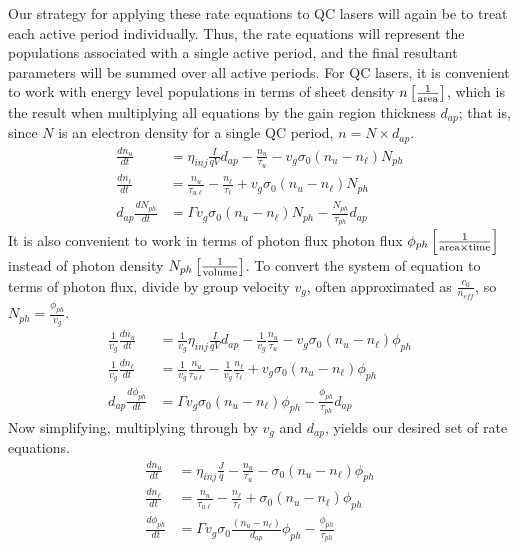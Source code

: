 \documentclass[12pt]{report}
\begin{document}
Our strategy for applying these rate equations to QC lasers will again be to treat each active period individually.  Thus, the rate equations will represent the populations associated with a single active period, and the final resultant parameters will be summed over all active periods.  For QC lasers, it is convenient to work with energy level populations in terms of sheet density $n \left[\frac{1}{\textnormal{area}}\right]$, which is the result when multiplying all equations by the gain region thickness $d_{ap}$; that is, since $N$ is an electron density for a single QC period, $n=N\times d_{ap}$.
\begin{subequations}
\begin{align}
\frac{d n_u}{dt}&=\eta_\textit{inj} \frac{I}{q V} d_{ap}-\frac{n_u}{\tau_u}-v_g \sigma_0 (n_u-n_\ell) N_{ph}\\
\frac{d n_\ell}{dt}&=\frac{n_u}{\tau_{u\ell}}-\frac{n_\ell}{\tau_\ell}+v_g \sigma_0 (n_u-n_\ell) N_{ph}\\
d_{ap} \frac{d N_{ph}}{dt}&=\Gamma v_g \sigma_0 (n_u-n_\ell) N_{ph} - \frac{N_{ph}}{\tau_{ph}} d_{ap}
\end{align}
\end{subequations}
It is also convenient to work in terms of photon flux photon flux $\phi_{ph} \left[\frac{1}{\textnormal{area}\times\textnormal{time}}\right]$ instead of photon density $N_{ph} \left[\frac{1}{\textnormal{volume}}\right]$.  To convert the system of equation to terms of photon flux, divide by group velocity $v_g$, often approximated as $\frac{c_0}{n_\textit{eff}}$, so $N_{ph}=\frac{\phi_{ph}}{v_g}$.
\begin{subequations}
\begin{align}
\frac{1}{v_g} \frac{d n_u}{dt}&=\frac{1}{v_g} \eta_\textit{inj} \frac{I}{q V} d_{ap}-\frac{1}{v_g} \frac{n_u}{\tau_u}-v_g \sigma_0 (n_u-n_\ell) \phi_{ph}\\
\frac{1}{v_g} \frac{d n_\ell}{dt}&=\frac{1}{v_g} \frac{n_u}{\tau_{u\ell}}-\frac{1}{v_g} \frac{n_\ell}{\tau_\ell}+v_g \sigma_0 (n_u-n_\ell) \phi_{ph}\\
d_{ap} \frac{d \phi_{ph}}{dt}&=\Gamma v_g \sigma_0 (n_u-n_\ell) \phi_{ph} - \frac{\phi_{ph}}{\tau_{ph}} d_{ap}
\end{align}
\end{subequations}
Now simplifying, multiplying through by $v_g$ and $d_{ap}$, yields our desired set of rate equations.
\begin{subequations}
\label{chpt1eqn:req}
\begin{align}
\label{chpt1eqn:reqA}
\frac{d n_u}{dt}&=\eta_\textit{inj} \frac{J}{q}- \frac{n_u}{\tau_u}-\sigma_0 (n_u-n_\ell) \phi_{ph}\\
\label{chpt1eqn:reqB}
\frac{d n_\ell}{dt}&=\frac{n_u}{\tau_{u\ell}}- \frac{n_\ell}{\tau_\ell}+\sigma_0 (n_u-n_\ell) \phi_{ph}\\
\label{chpt1eqn:reqC}
\frac{d \phi_{ph}}{dt}&=\Gamma v_g \sigma_0 \frac{(n_u-n_\ell)}{d_{ap}} \phi_{ph} - \frac{\phi_{ph}}{\tau_{ph}}
\end{align}
\end{subequations}
\end{document}
